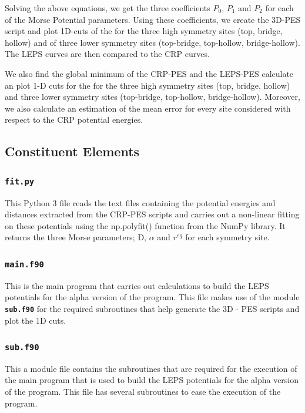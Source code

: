 \documentclass[12pt]{article}
\begin{document}
Solving the above equations, we get the three coefficients $P_0$, $P_1$ and $P_2$ for each of the Morse Potential parameters. Using these coefficients, we create the 3D-PES script and plot 1D-cuts of the for the three high symmetry sites (top, bridge, hollow) and of
three lower symmetry sites (top-bridge, top-hollow, bridge-hollow). The LEPS curves are then compared to the CRP curves.

We also find the global minimum of the CRP-PES and the LEPS-PES calculate an plot 1-D cuts for the for the three high symmetry sites (top, bridge, hollow) and three lower symmetry sites (top-bridge, top-hollow, bridge-hollow). Moreover, we also calculate an estimation of the mean error for every site considered with respect to the CRP potential energies.


 
\subsection{Constituent Elements}
 
\subsubsection{\textbf{{\texttt{fit.py}}}}
 
This Python 3 file reads the text files containing the potential energies and distances extracted from the CRP-PES scripts and carries out a non-linear fitting on these potentials using the np.polyfit() function from the NumPy library. It returns the three Morse parameters; D, $\alpha$ and $r^{eq}$ for each symmetry site.

\subsubsection{\textbf{{\texttt{main.f90}}}}
This is the main program that carries out calculations to build the LEPS potentials for the alpha version of the program. This file makes use of the module {\fontsize{10}{6}\textbf{{\texttt{sub.f90}}}} for the required subroutines that help generate the 3D - PES scripts and plot the 1D cuts. 

\pagebreak
\subsubsection{\textbf{{\texttt{sub.f90}}}}

This a module file contains the subroutines that are required for the execution of the main program that is used to build the LEPS potentials for the alpha version of the program. This file has several subroutines to ease the execution of the program.
\end{document}
